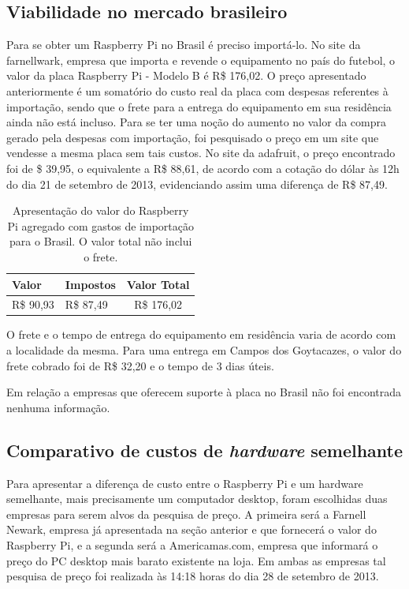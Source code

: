 \subsection{Viabilidade no mercado brasileiro}

Para se obter um Raspberry Pi no Brasil é preciso importá-lo. No site da farnellwark, empresa que importa e revende o equipamento no país do futebol, o valor da placa Raspberry Pi - Modelo B é R\$ 176,02. O preço apresentado anteriormente é um somatório do custo real da placa com despesas referentes à importação, sendo que o frete para a entrega do equipamento em sua residência ainda não está incluso. Para se ter uma noção do aumento no valor da compra gerado pela despesas com importação, foi pesquisado o preço em um site que vendesse a mesma placa sem tais custos. No site da adafruit, o preço encontrado foi de \$ 39,95, o equivalente a R\$ 88,61, de acordo com a cotação do dólar às 12h do dia 21 de setembro de 2013, evidenciando assim uma diferença de R\$ 87,49.

\begin{table}[!htpb]
 \centering
    \begin{tabular}{|l|p{3cm}|c|} 
    \hline
        \textbf{Valor} & \textbf{Impostos} & \textbf{Valor Total} \\
    \hline
        R\$ 90,93 & R\$ 87,49 & R\$ 176,02 \\
    \hline
    \end{tabular}
    \caption{Apresentação do valor do Raspberry Pi agregado com gastos de importação para o Brasil. O valor total não inclui o frete.}
    \label{t_fixa}
\end{table}

O frete e o tempo de entrega do equipamento em residência varia de acordo com a localidade da mesma. Para uma entrega em Campos dos Goytacazes, o valor do frete cobrado foi de R\$ 32,20 e o tempo de 3 dias úteis.

Em relação a empresas que oferecem suporte à placa no Brasil não foi encontrada nenhuma informação.

\subsection{Comparativo de custos de \textit{hardware} semelhante}

Para apresentar a diferença de custo entre o Raspberry Pi e um hardware semelhante, mais precisamente um computador desktop, foram escolhidas duas empresas para serem alvos da pesquisa de preço. A primeira será a Farnell Newark, empresa já apresentada na seção anterior e que fornecerá o valor do Raspberry Pi, e a segunda será a Americamas.com, empresa que informará o preço do PC desktop mais barato existente na loja. Em ambas as empresas tal pesquisa de preço foi realizada às 14:18 horas do dia 28 de setembro de 2013.

